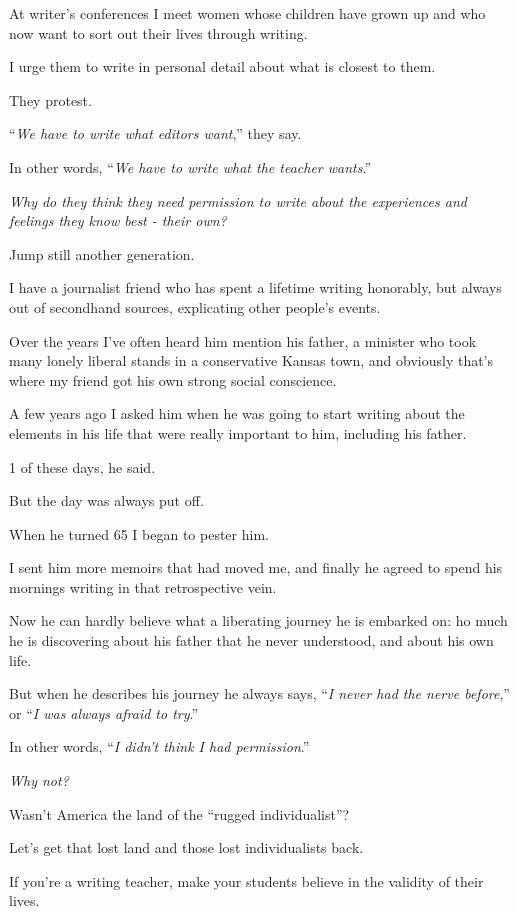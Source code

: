 \documentclass{book}
\numberwithin{equation}{section}
\begin{document}
At writer's conferences I meet women whose children have grown up and who now want to sort out their lives through writing.

I urge them to write in personal detail about what is closest to them.

They protest.

``\textit{We have to write what editors want},'' they say.

In other words, ``\textit{We have to write what the teacher wants}.''

\textit{Why do they think they need permission to write about the experiences and feelings they know best - their own?}

%
Jump still another generation.

I have a journalist friend who has spent a lifetime writing honorably, but always out of secondhand sources, explicating other people's events.

Over the years I've often heard him mention his father, a minister who took many lonely liberal stands in a conservative Kansas town, and obviously that's where my friend got his own strong social conscience.

A few years ago I asked him when he was going to start writing about the elements in his life that were really important to him, including his father.

1 of these days, he said.

But the day was always put off.

%
When he turned 65 I began to pester him.

I sent him more memoirs that had moved me, and finally he agreed to spend his mornings writing in that retrospective vein.

Now he can hardly believe what a liberating journey he is embarked on: ho much he is discovering about his father that he never understood, and about his own life.

But when he describes his journey he always says, ``\textit{I never had the nerve before},'' or ``\textit{I was always afraid to try}.''

In other words, ``\textit{I didn't think I had permission}.''

%
\textit{Why not?}

Wasn't America the land of the ``rugged individualist''?

Let's get that lost land and those lost individualists back.

If you're a writing teacher, make your students believe in the validity of their lives.
\end{document}
